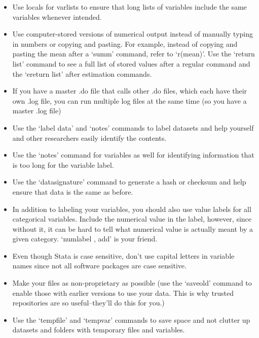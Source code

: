 \documentclass[12pt] {article}
\begin{document}
\begin{itemize}
\item
  Use locals for varlists to ensure that long lists of variables include the same variables whenever intended.
\item
  Use computer-stored versions of numerical output instead of manually typing in numbers or copying and pasting. For example, instead of copying and pasting the mean after a `summ' command, refer to `r(mean)'. Use the `return list' command to see a full list of stored values after a regular command and the `ereturn list' after estimation commands.
\item
  If you have a master .do file that calls other .do files, which each have their own .log file, you can run
  multiple log files at the same time (so you have a master .log file)
\item
  Use the `label data' and `notes' commands to label datasets and help yourself and other researchers easily identify the contents.
\item
  Use the `notes' command for variables as well for identifying information that is too long for the variable label.
\item
  Use the `datasignature' command to generate a hash or checksum and help ensure that data is
  the same as before.
\item
  In addition to labeling your variables, you should also use value labels for all categorical variables. Include the numerical value in the label, however, since without it, it can be hard to tell what numerical value is actually meant by a given category. `numlabel , add' is your friend.
\item
  Even though Stata is case sensitive, don't use capital letters in variable names since not all software packages
  are case sensitive.
\item
  Make your files as non-proprietary as possible (use the `saveold'
  command to enable those with earlier versions to use your data. This
  is why trusted repositories are so useful--they'll do this for you.)

\item Use the `tempfile' and `tempvar' commands to save space and not clutter up datasets and folders with temporary files and variables.

   
  
\end{itemize}
\end{document}
